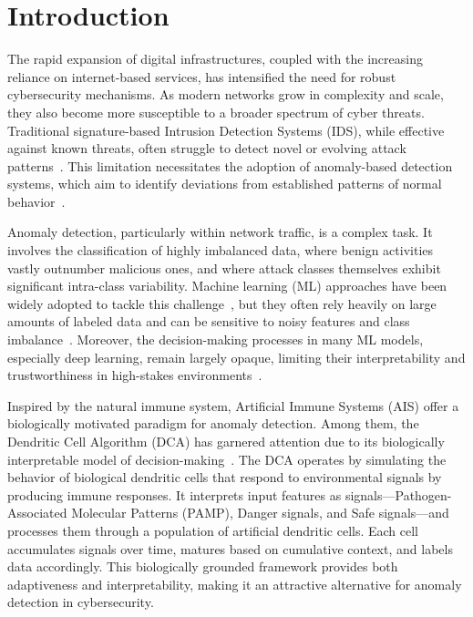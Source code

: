 \documentclass[conference]{IEEEtran}
\begin{document}
\section{Introduction}

The rapid expansion of digital infrastructures, coupled with the
increasing reliance on internet-based services, has intensified the
need for robust cybersecurity mechanisms. As modern networks grow in
complexity and scale, they also become more susceptible to a broader
spectrum of cyber threats. Traditional signature-based Intrusion
Detection Systems (IDS), while effective against known threats, often
struggle to detect novel or evolving attack
patterns~\cite{liao_intrusion_2013}. This limitation
necessitates the adoption of anomaly-based detection systems, which
aim to identify deviations from established patterns of normal
behavior~\cite{pawar2015network}.

Anomaly detection, particularly within network traffic, is a complex
task. It involves the classification of highly imbalanced data, where
benign activities vastly outnumber malicious ones, and where attack
classes themselves exhibit significant intra-class variability.
Machine learning (ML) approaches have been widely adopted to tackle
this challenge~\cite{kilincer_machine_2021}, but they often rely
heavily on large amounts of
labeled data and can be sensitive to noisy features and class
imbalance~\cite{Devi2020ARO}. Moreover, the decision-making processes
in many ML models,
especially deep learning, remain largely opaque, limiting their
interpretability and trustworthiness in high-stakes
environments~\cite{vinayakumar2019deep}.

Inspired by the natural immune system, Artificial Immune Systems
(AIS) offer a biologically motivated paradigm for anomaly detection.
Among them, the Dendritic Cell Algorithm (DCA) has garnered attention
due to its biologically interpretable model of decision-making~\cite{greensmith_dendritic_2007}. The
DCA operates by simulating the behavior of biological dendritic cells
that respond to environmental signals by producing immune responses.
It interprets input features as signals—Pathogen-Associated Molecular
Patterns (PAMP), Danger signals, and Safe signals—and processes them
through a population of artificial dendritic cells. Each cell
accumulates signals over time, matures based on cumulative context,
and labels data accordingly. This biologically grounded framework
provides both adaptiveness and interpretability, making it an
attractive alternative for anomaly detection in cybersecurity.
\end{document}
